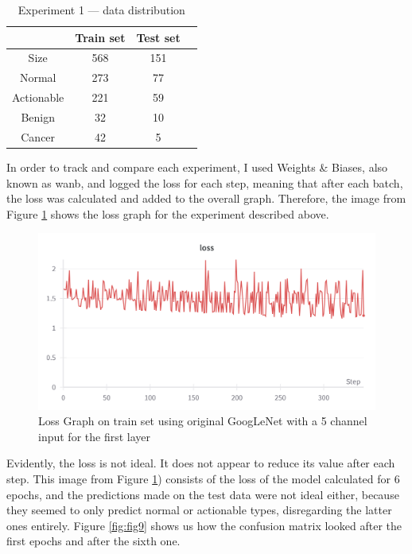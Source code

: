 \begin{table}[ht!]
\centering
\begin{tabular}{|c|c|c|c|}
    \hline
    & Train set & Test set \\ \hline
    Size & 568 & 151 \\ \hline
    Normal & 273 & 77\\ \hline
    Actionable & 221 & 59\\ \hline
    Benign & 32 & 10\\ \hline
    Cancer & 42 & 5\\ \hline
    \end{tabular}
    \caption{Experiment 1 --- data distribution}
    \label{tab:tab1}
\end{table}

In order to track and compare each experiment, I used Weights \& Biases, also known as wanb, and logged the loss for each step, meaning that after each batch, the loss was calculated and added to the overall graph. Therefore, the image from Figure \ref{fig:fig8} shows the loss graph for the experiment described above.

\begin{figure}[!ht]
    \centering
    \includegraphics[width=1\textwidth]{figures/Figure8.png}
    \caption{Loss Graph on train set using original GoogLeNet with a 5 channel input for the first layer}
    \label{fig:fig8}
\end{figure}

Evidently, the loss is not ideal. It does not appear to reduce its value after each step. This image from Figure \ref{fig:fig8}) consists of the loss of the model calculated for 6 epochs, and the predictions made on the test data were not ideal either, because they seemed to only predict normal or actionable types, disregarding the latter ones entirely. Figure \ref{fig:fig9} shows us how the confusion matrix looked after the first epochs and after the sixth one.

